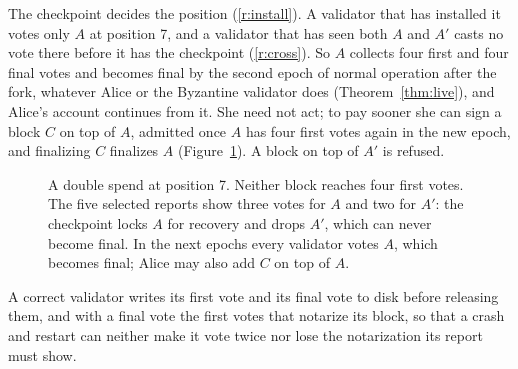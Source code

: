 The checkpoint decides the position (\ref{r:install}). A validator that has installed it votes only $A$ at position 7, and a validator that has seen both $A$ and $A'$ casts no vote there before it has the checkpoint (\ref{r:cross}). So $A$ collects four first and four final votes and becomes final by the second epoch of normal operation after the fork, whatever Alice or the Byzantine validator does (Theorem~\ref{thm:live}), and Alice's account continues from it. She need not act; to pay sooner she can sign a block $C$ on top of $A$, admitted once $A$ has four first votes again in the new epoch, and finalizing $C$ finalizes $A$ (Figure~\ref{fig:fork}). A block on top of $A'$ is refused.

\begin{figure}[t]
\centering
{}
\caption{A double spend at position 7. Neither block reaches four first votes. The five selected reports show three votes for $A$ and two for $A'$: the checkpoint locks $A$ for recovery and drops $A'$, which can never become final. In the next epochs every validator votes $A$, which becomes final; Alice may also add $C$ on top of $A$.}
\label{fig:fork}
\end{figure}

A correct validator writes its first vote and its final vote to disk before releasing them, and with a final vote the first votes that notarize its block, so that a crash and restart can neither make it vote twice nor lose the notarization its report must show.
